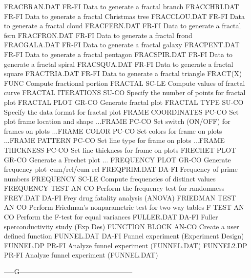 FRACBRAN.DAT                FR-FI Data to generate a fractal branch
FRACCHRI.DAT                FR-FI Data to generate a fractal Christmas tree
FRACCLOU.DAT                FR-FI Data to generate a fractal cloud
FRACFERN.DAT                FR-FI Data to generate a fractal fern
FRACFRON.DAT                FR-FI Data to generate a fractal frond
FRACGALA.DAT                FR-FI Data to generate a fractal galaxy
FRACPENT.DAT                FR-FI Data to generate a fractal pentagon
FRACSPIR.DAT                FR-FI Data to generate a fractal spiral
FRACSQUA.DAT                FR-FI Data to generate a fractal square
FRACTRIA.DAT                FR-FI Data to generate a fractal triangle
FRACT(X)                    FUNC  Compute fractional portion
FRACTAL                     SC-LE Compute values of fractal curve
FRACTAL ITERATIONS          SU-CO Specify the number of points for fractal plot
FRACTAL PLOT                GR-CO Generate fractal plot
FRACTAL TYPE                SU-CO Specify the data format for fractal plot
FRAME COORDINATES           PC-CO Set plot frame location and shape
...FRAME                    PC-CO Set switch (ON/OFF) for frames on plots
...FRAME COLOR              PC-CO Set colors for frame on plots
...FRAME PATTERN            PC-CO Set line type for frame on plots
...FRAME THICKNESS          PC-CO Set line thickness for frame on plots
FRECHET PLOT                GR-CO Generate a Frechet plot
... FREQUENCY PLOT          GR-CO Generate frequency plot--cum/rel/cum rel
FREQPRIM.DAT                DA-FI Frequency of prime numbers
FREQUENCY                   SC-LE Compute frequencies of distinct values
FREQUENCY TEST              AN-CO Perform the frequency test for randomness
FREY.DAT                    DA-FI Frey drug fatality analysis (ANOVA)
FRIEDMAN TEST               AN-CO Perform Friedman's nonparametric test for two-way tables
F TEST                      AN-CO Perform the F-test for equal variances
FULLER.DAT                  DA-FI Fuller sperconductivity study (Exp Des)
FUNCTION BLOCK              AN-CO Create a user defined function
FUNNEL.DAT                  DA-FI Funnel experiment (Experiment Design)
FUNNEL.DP                   PR-FI Analyze funnel experiment (FUNNEL.DAT)
FUNNEL2.DP                  PR-FI Analyze funnel experiment (FUNNEL.DAT)

-----G--------------------------------------------------

